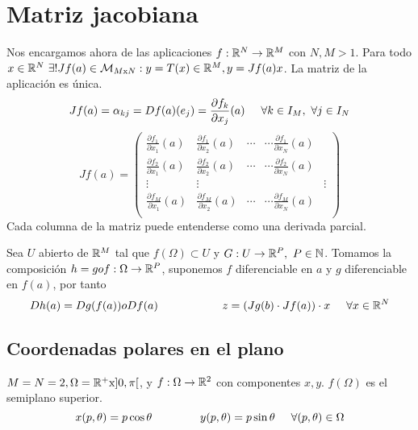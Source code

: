 \section{Matriz jacobiana}
Nos encargamos ahora de las aplicaciones $f:\mathbb{R}^N\rightarrow\mathbb{R}^M$ con $N,M>1$. Para todo $x\in\mathbb{R}^N\ \exists! Jf(a)\in\mathcal{M}_{M\text{x}N} : y=T(x)\in\mathbb{R}^M,y=Jf(a)x$. La matriz de la aplicación es única.
$$ Jf(a) = \alpha_{kj}= Df(a)(e_j) = \frac{\partial f_k}{\partial x_j}(a) \hspace{0.5cm} \forall k\in I_M,\ \forall j\in I_N $$
$$ Jf(a) = \left(
\begin{matrix}
	\frac{\partial f_1}{\partial x_1} (a) & 	\frac{\partial f_1}{\partial x_2} (a) & \cdots & \cdots 	\frac{\partial f_1}{\partial x_N} (a) \\
	\frac{\partial f_2}{\partial x_1} (a) & 	\frac{\partial f_2}{\partial x_2} (a) & \cdots & \cdots 	\frac{\partial f_2}{\partial x_N} (a) \\	
	\vdots & \vdots & & & \vdots \\
	\frac{\partial f_M}{\partial x_1} (a) & 	\frac{\partial f_M}{\partial x_2} (a) & \cdots & \cdots 	\frac{\partial f_M}{\partial x_N} (a) \\	
\end{matrix}
\right) $$
Cada columna de la matriz puede entenderse como una derivada parcial.

Sea $U$ abierto de $\mathbb{R}^M$ tal que $f(\Omega) \subset U$ y $G:U\rightarrow \mathbb{R}^P, \ P\in\mathbb{N}$. Tomamos la composición $h=gof:\Omega\rightarrow\mathbb{R}^P$, suponemos $f$ diferenciable en $a$ y $g$ diferenciable en $f(a)$, por tanto
$$ Dh(a) = Dg(f(a)) o Df(a) \hspace{2cm}
z = (Jg(b)\cdot Jf(a))\cdot x\hspace{0.5cm}\forall x\in\mathbb{R}^N$$

\subsection{Coordenadas polares en el plano}
$M=N=2, \Omega=\mathbb{R}^+\text{x}]0,\pi[$, y $f:\Omega\rightarrow\mathbb{R}^2$ con componentes $x,y$. $f(\Omega)$ es el semiplano superior.
$$ x(p,\theta) = p\cos \theta\hspace{1.5cm} y(p,\theta) = p\sin\theta\hspace{0.5cm} \forall (p,\theta)\in\Omega$$